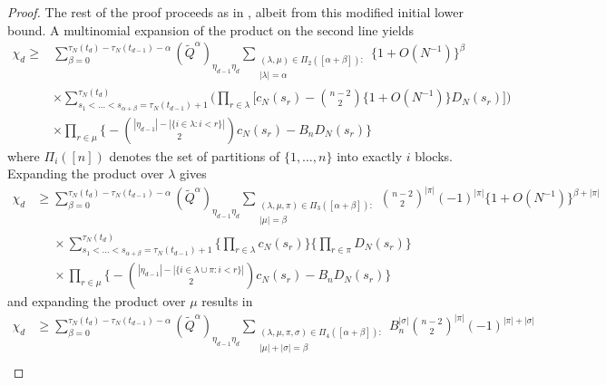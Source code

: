 \documentclass{article}
\theoremstyle{definition}
\newcommand{\1}[1]{\mathbbm{1}_{\{#1\}}}
\begin{document}
\begin{proof}
The rest of the proof proceeds as in \citet{koskela2018}, albeit from this modified initial lower bound.
A multinomial expansion of the product on the second line yields 
\begin{align*}
\chi_d \geq {}& \sum_{ \beta = 0 }^{ \tau_N( t_d ) - \tau_N( t_{ d - 1 } ) - \alpha } ( \tilde{ Q }^{ \alpha } )_{ \eta_{ d - 1 } \eta_d } \sum_{\substack{ ( \lambda, \mu ) \in \Pi_2( [ \alpha + \beta ] ) :\\ | \lambda | = \alpha }} \{ 1 + O( N^{ -1 } ) \}^{ \beta } \\
&\times \sum_{ s_1 < \ldots < s_{ \alpha + \beta } = \tau_N( t_{ d - 1 } ) + 1 }^{ \tau_N( t_d ) } \Bigg( \prod_{ r \in \lambda } \Bigg[ c_N( s_r ) - \binom{ n - 2 }{ 2 } \{ 1 + O( N^{ -1 } ) \} D_N( s_r ) \Bigg] \Bigg)\\
&\times \prod_{ r \in \mu } \Bigg\{ - \binom{ | \eta_{ d - 1 } | - | \{ i \in \lambda : i < r \} | }{ 2 } c_N( s_r ) - B_n D_N( s_r ) \Bigg\}
\end{align*}
where $\Pi_i([n])$ denotes the set of partitions of $\{1, \dots,n\}$ into exactly $i$ blocks.
Expanding the product over $\lambda$ gives
\begin{align*}
\chi_d &\geq \sum_{ \beta = 0 }^{ \tau_N( t_d ) - \tau_N( t_{ d - 1 } ) - \alpha } ( \tilde{ Q }^{ \alpha } )_{ \eta_{ d - 1 } \eta_d } \sum_{\substack{ ( \lambda, \mu, \pi ) \in \Pi_3( [ \alpha + \beta ] ) :\\ | \mu | = \beta }} \binom{ n - 2 }{ 2 }^{ | \pi | } ( -1 )^{ | \pi | } \{ 1 + O( N^{ -1 } ) \}^{ \beta + | \pi | } \\
&\phantom{\geq} \times \sum_{ s_1 < \ldots < s_{ \alpha + \beta } = \tau_N( t_{ d - 1 } ) + 1 }^{ \tau_N( t_d ) } \Bigg\{ \prod_{ r \in \lambda } c_N( s_r ) \Bigg\} \Bigg\{ \prod_{ r \in \pi }  D_N( s_r ) \Bigg\} \\
&\phantom{\geq} \times \prod_{ r \in \mu } \Bigg\{ - \binom{ | \eta_{ d - 1 } | - | \{ i \in \lambda \cup \pi : i < r \} | }{ 2 } c_N( s_r ) - B_n D_N( s_r ) \Bigg\}
\end{align*}
and expanding the product over $\mu$ results in
\begin{align*}
\chi_d &\geq \sum_{ \beta = 0 }^{ \tau_N( t_d ) - \tau_N( t_{ d - 1 } ) - \alpha } ( \tilde{ Q }^{ \alpha } )_{ \eta_{ d - 1 } \eta_d } \sum_{\substack{ ( \lambda, \mu, \pi, \sigma ) \in \Pi_4( [ \alpha + \beta ] ) :\\ | \mu | + | \sigma | = \beta }} B_n^{ | \sigma | } \binom{ n - 2 }{ 2 }^{ | \pi | } ( -1 )^{ | \pi | + | \sigma | } \\

\end{align*}
\end{proof}
\end{document}
